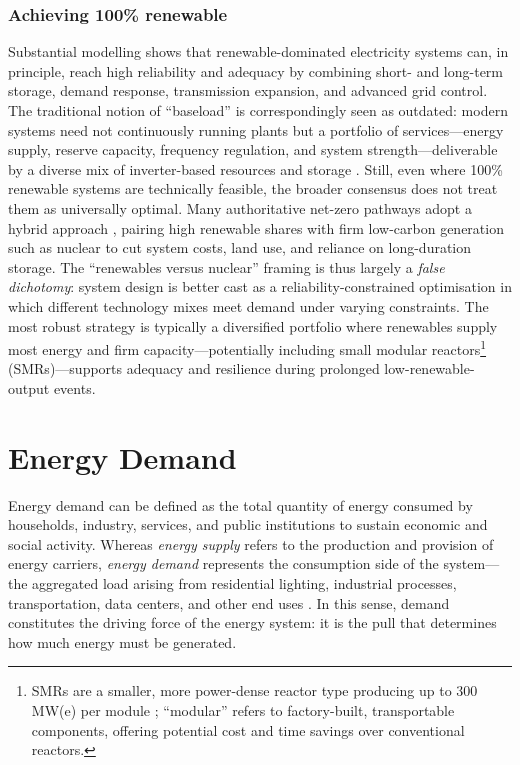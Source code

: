 \subsubsection*{Achieving 100\% renewable}
Substantial modelling shows that renewable-dominated electricity systems can, in principle, reach high reliability and adequacy \cite{Denholm2021, Brown2018, Zappa2019} by combining short- and long-term storage, demand response, transmission expansion, and advanced grid control. The traditional notion of ``baseload'' is correspondingly seen as outdated: modern systems need not continuously running plants but a portfolio of services—energy supply, reserve capacity, frequency regulation, and system strength—deliverable by a diverse mix of inverter-based resources and storage \cite{NREL_GFM2020}.
\newline Still, even where 100\% renewable systems are technically feasible, the broader consensus does not treat them as universally optimal. Many authoritative net-zero pathways adopt a hybrid approach \cite{IEA_NetZero2021, IEA_Nuclear2019}, pairing high renewable shares with firm low-carbon generation such as nuclear to cut system costs, land use, and reliance on long-duration storage. The ``renewables versus nuclear'' framing is thus largely a \textit{false dichotomy}: system design is better cast as a reliability-constrained optimisation in which different technology mixes meet demand under varying constraints. The most robust strategy is typically a diversified portfolio where renewables supply most energy and firm capacity—potentially including small modular reactors\footnote{SMRs are a smaller, more power-dense reactor type producing up to 300\,MW(e) per module \cite{SMRs2023}; ``modular'' refers to factory-built, transportable components, offering potential cost and time savings over conventional reactors.} (SMRs)—supports adequacy and resilience during prolonged low-renewable-output events.


\pagebreak
\section{Energy Demand}\label{sec:energy_demand}
Energy demand can be defined as the total quantity of energy consumed by households, industry, services, and public institutions to sustain economic and social activity. Whereas \textit{energy supply} refers to the production and provision of energy carriers, \textit{energy demand} represents the consumption side of the system—the aggregated load arising from residential lighting, industrial processes, transportation, data centers, and other end uses \cite{WhatEnergyDemand}. In this sense, demand constitutes the driving force of the energy system: it is the pull that determines how much energy must be generated.


